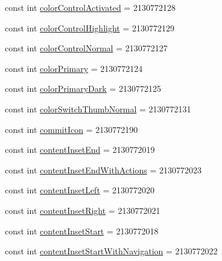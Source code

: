 \begin{DoxyCompactItemize}
\item 
const int \mbox{\hyperlink{class_f_w_p_s___app_1_1_droid_1_1_resource_1_1_attribute_add14dcbc1abca96ce825ff211bc59bcb}{color\+Control\+Activated}} = 2130772128
\item 
const int \mbox{\hyperlink{class_f_w_p_s___app_1_1_droid_1_1_resource_1_1_attribute_a922c5b95a624bad5a4c32a0e58f78472}{color\+Control\+Highlight}} = 2130772129
\item 
const int \mbox{\hyperlink{class_f_w_p_s___app_1_1_droid_1_1_resource_1_1_attribute_a46147c3c95c25f612b3e289bb77db7c3}{color\+Control\+Normal}} = 2130772127
\item 
const int \mbox{\hyperlink{class_f_w_p_s___app_1_1_droid_1_1_resource_1_1_attribute_a2a2c74cf3e402101be6f47549315bdad}{color\+Primary}} = 2130772124
\item 
const int \mbox{\hyperlink{class_f_w_p_s___app_1_1_droid_1_1_resource_1_1_attribute_afdeef34217aa2bd142d4036c29e8c163}{color\+Primary\+Dark}} = 2130772125
\item 
const int \mbox{\hyperlink{class_f_w_p_s___app_1_1_droid_1_1_resource_1_1_attribute_ac9d3bc7ea63833bb0065967fb0db9d92}{color\+Switch\+Thumb\+Normal}} = 2130772131
\item 
const int \mbox{\hyperlink{class_f_w_p_s___app_1_1_droid_1_1_resource_1_1_attribute_a3f4813d6d418458603bd37b010a8e7c4}{commit\+Icon}} = 2130772190
\item 
const int \mbox{\hyperlink{class_f_w_p_s___app_1_1_droid_1_1_resource_1_1_attribute_ad583c6152e74001c7633cba202ad8509}{content\+Inset\+End}} = 2130772019
\item 
const int \mbox{\hyperlink{class_f_w_p_s___app_1_1_droid_1_1_resource_1_1_attribute_a840e99aa090b404769498a0a92b133e5}{content\+Inset\+End\+With\+Actions}} = 2130772023
\item 
const int \mbox{\hyperlink{class_f_w_p_s___app_1_1_droid_1_1_resource_1_1_attribute_af2bf32b5db52baa548590bc4253fde82}{content\+Inset\+Left}} = 2130772020
\item 
const int \mbox{\hyperlink{class_f_w_p_s___app_1_1_droid_1_1_resource_1_1_attribute_a1290c38ba1d66edef802bed3b35c67d1}{content\+Inset\+Right}} = 2130772021
\item 
const int \mbox{\hyperlink{class_f_w_p_s___app_1_1_droid_1_1_resource_1_1_attribute_ab795c3cd515bfb8811cc6e358b859ecd}{content\+Inset\+Start}} = 2130772018
\item 
const int \mbox{\hyperlink{class_f_w_p_s___app_1_1_droid_1_1_resource_1_1_attribute_af9a20698bc71e96bd5e12eb9b910d27b}{content\+Inset\+Start\+With\+Navigation}} = 2130772022

\end{DoxyCompactItemize}
